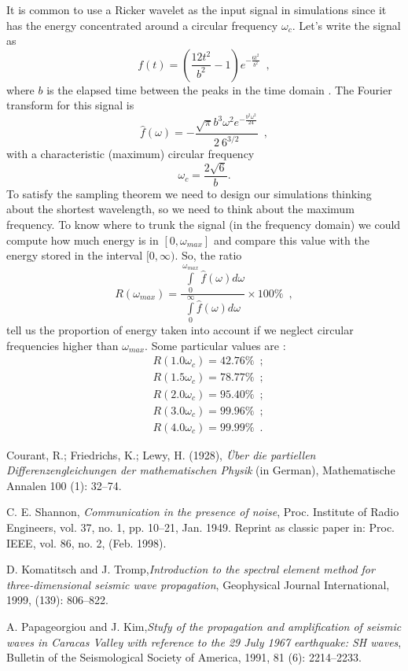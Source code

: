 \documentclass[12pt,letterpaper,landscape]{article}
\begin{document}
It is common to use a Ricker wavelet as the input signal in simulations
since it has the energy concentrated around a circular frequency $\omega_{c}$.
Let's write the signal as 
\[
f(t)=\left(\frac{12t^{2}}{b^{2}}-1\right)e^{-\frac{6t^{2}}{b^{2}}}\enspace,
\]
 where $b$ is the elapsed time between the peaks in the time domain
\cite{Papageorgiou91}. The Fourier transform for this signal is 
\[
\hat{f}(\omega)=-\frac{\sqrt{\pi}b^{3}\omega^{2}e^{-\frac{b^{2}\omega^{2}}{24}}}{2\ 6^{3/2}}\enspace,
\]
 with a characteristic (maximum) circular frequency 
\[
\omega_{c}=\frac{2\sqrt{6}}{b}.
\]
 To satisfy the sampling theorem we need to design our simulations
thinking about the shortest wavelength, so we need to think about
the maximum frequency. To know where to trunk the signal (in the frequency
domain) we could compute how much energy is in $[0,\omega_{max}]$
and compare this value with the energy stored in the interval $[0,\infty)$.
So, the ratio 
\[
R(\omega_{max})=\frac{\int\limits _{0}^{\omega_{max}}\hat{f}(\omega)d\omega}{\int\limits _{0}^{\infty}\hat{f}(\omega)d\omega}\times100\%\enspace,
\]
 tell us the proportion of energy taken into account if we neglect
circular frequencies higher than $\omega_{max}$. Some particular
values are : 
\begin{align}
 & R(1.0\omega_{c})=42.76\%\enspace;\\
 & R(1.5\omega_{c})=78.77\%\enspace;\\
 & R(2.0\omega_{c})=95.40\%\enspace;\\
 & R(3.0\omega_{c})=99.96\%\enspace;\\
 & R(4.0\omega_{c})=99.99\%\enspace.
\end{align}

\begin{thebibliography}{1}
 Courant, R.; Friedrichs, K.; Lewy, H. (1928), \emph{\"Uber
die partiellen Differenzengleichungen der mathematischen Physik} (in
German), Mathematische Annalen 100 (1): 32--74.

 C. E. Shannon, \emph{Communication in the presence
of noise}, Proc. Institute of Radio Engineers, vol. 37, no. 1, pp.
10--21, Jan. 1949. Reprint as classic paper in: Proc. IEEE, vol. 86,
no. 2, (Feb. 1998).

 D. Komatitsch and J. Tromp,\emph{Introduction
to the spectral element method for three-dimensional seismic wave
propagation}, Geophysical Journal International, 1999, (139): 806--822.

 A. Papageorgiou and J. Kim,\emph{Stufy of
the propagation and amplification of seismic waves in Caracas Valley
with reference to the 29 July 1967 earthquake: SH waves}, Bulletin
of the Seismological Society of America, 1991, 81 (6): 2214--2233. \end{thebibliography}
\end{document}
